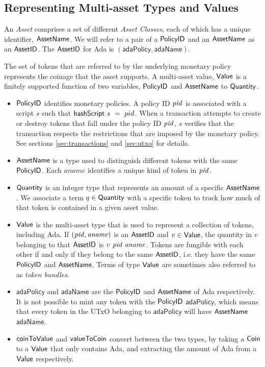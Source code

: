 \subsection*{Representing Multi-asset Types and Values}
An \emph{Asset} comprises a set of different \emph{Asset Classes}, each of which has
a unique identifier, $\mathsf{AssetName}$. We will refer to a pair of a $\mathsf{PolicyID}$ and an
$\mathsf{AssetName}$ as an $\mathsf{AssetID}$. The $\mathsf{AssetID}$ for Ada is $(\mathsf{adaPolicy}, \mathsf{adaName})$.

The set of tokens that are referred to by the underlying monetary
policy represents the coinage that the asset supports. A multi-asset
value, $\mathsf{Value}$ is a finitely supported function of two variables,
$\mathsf{PolicyID}$ and $\mathsf{AssetName}$ to $\mathsf{Quantity}$.

\begin{itemize}
  \item $\mathsf{PolicyID}$ identifies monetary policies. A policy ID $\mathit{pid}$ is associated with a script
    $s$ such that $\mathsf{hashScript}~s~=~pid$. When a transaction attempts to create or destroy tokens
    that fall under the policy ID $\mathit{pid}$,
    $s$ verifies that the transaction
    respects the restrictions that are imposed by the monetary policy.
    See sections \ref{sec:transactions} and \ref{sec:utxo} for details.

  \item $\mathsf{AssetName}$ is a type used to distinguish different tokens with the same $\mathsf{PolicyID}$.
    Each $aname$ identifies a unique kind of token in $\mathit{pid}$.

  \item $\mathsf{Quantity}$ is an integer type that represents an amount of a specific $\mathsf{AssetName}$. We associate
    a term $q\in\mathsf{Quantity}$ with a specific token to track how much of that token is contained in a given asset value.

  \item $\mathsf{Value}$ is the multi-asset type that is used to represent
    a collection of tokens, including Ada. If $(\mathit{pid}, \mathit{aname})$ is an $\mathsf{AssetID}$ and $v \in \mathsf{Value}$,
    the quantity in $v$ belonging to that $\mathsf{AssetID}$ is $v~\mathit{pid}~\mathit{aname}$.
    Tokens are fungible with each other if and only if they belong to the same $\mathsf{AssetID}$,
    i.e. they have the same $\mathsf{PolicyID}$ and $\mathsf{AssetName}$. Terms of type $\mathsf{Value}$ are sometimes also referred to as
    \emph{token bundles}.

  \item $\mathsf{adaPolicy}$ and $\mathsf{adaName}$ are the $\mathsf{PolicyID}$ and $\mathsf{AssetName}$ of Ada respectively.
    It is not possible to mint any token with the $\mathsf{PolicyID}$ $\mathsf{adaPolicy}$, which means that every
    token in the UTxO belonging to $\mathsf{adaPolicy}$ will have $\mathsf{AssetName}$ $\mathsf{adaName}$.

  \item $\mathsf{coinToValue}$ and $\mathsf{valueToCoin}$ convert between the two types,
  by taking a $\mathsf{Coin}$ to a $\mathsf{Value}$ that only contains Ada, and extracting the amount of Ada from a $\mathsf{Value}$ respectively.
\end{itemize}

